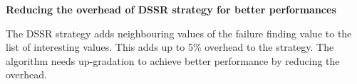 \textbf{Reducing the overhead of DSSR strategy for better performances}

The DSSR strategy adds neighbouring values of the failure finding value to the list of interesting values. This adds up to 5\% overhead to the strategy. The algorithm needs up-gradation to achieve better performance by reducing the overhead.\\









